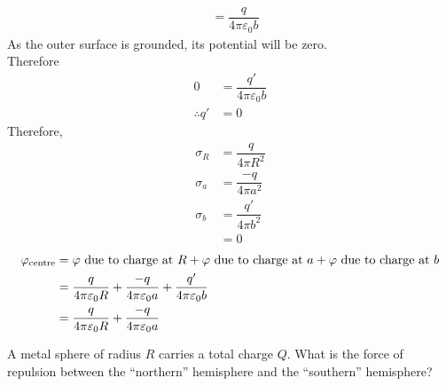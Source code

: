 \documentclass[fleqn, a4paper, 11pt, oneside]{amsart}
\theoremstyle{definition}
\theoremstyle{theorem}
\begin{document}
\begin{solution}
\begin{enumerate}[leftmargin=*]
\begin{align*}
                                          & = \dfrac{q}{4 \pi \varepsilon_0 b}
			\end{align*}
			As the outer surface is grounded, its potential will be zero.\\
			Therefore
			\begin{align*}
				0             & = \dfrac{q'}{4 \pi \varepsilon_0 b} \\
				\therefore q' & = 0
			\end{align*}
			Therefore,
			\begin{align*}
				\sigma_R & = \dfrac{q}{4 \pi R^2}  \\
				\sigma_a & = \dfrac{-q}{4 \pi a^2} \\
				\sigma_b & = \dfrac{q'}{4 \pi b^2} \\
                                         & = 0
			\end{align*}
			\begin{align*}
				\varphi_{\textnormal{centre}} & = \textnormal{$\varphi$ due to charge at $R$} + \textnormal{$\varphi$ due to charge at $a$} + \textnormal{$\varphi$ due to charge at $b$} \\
                                                              & = \dfrac{q}{4 \pi \varepsilon_0 R}            + \dfrac{-q}{4 \pi \varepsilon_0 a}           + \dfrac{q'}{4 \pi \varepsilon_0 b}                                \\
                                                              & = \dfrac{q}{4 \pi \varepsilon_0 R}            + \dfrac{-q}{4 \pi \varepsilon_0 a}
			\end{align*}
	\end{enumerate}
\end{solution}

\begin{question}
	A metal sphere of radius $R$ carries a total charge $Q$.
	What is the force of repulsion between the ``northern'' hemisphere and the ``southern'' hemisphere?
\end{question}
\end{document}
